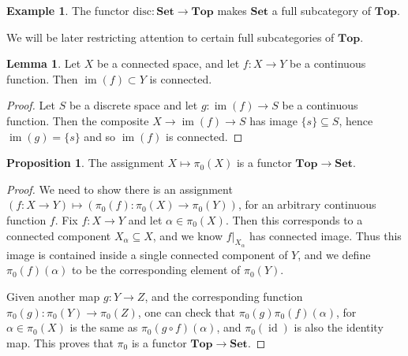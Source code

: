 \documentclass{tufte-handout}
\def\Set {\mathbf{Set}}
\def\Top {\mathbf{Top}}
\DeclareMathOperator{\id}{id}
\DeclareMathOperator{\im}{im}
\theoremstyle{definition}
\newtheorem{prop}{Proposition}
\newtheorem{lemma}{Lemma}
\newtheorem{example}{Example}
\begin{document}
\begin{example}
The functor 
$\mathrm{disc}\colon \Set \to \Top$ makes $\Set$ a full subcategory of $\Top$.
\end{example}

We will be later restricting attention to certain full subcategories of $\Top$.

\begin{lemma}\label{lemma:image_of_connected}
Let $X$ be a connected space, and let $f\colon X\to Y$ be a continuous function. 
Then $\im(f) \subset Y$ is connected.
\end{lemma}

\begin{proof}
Let $S$ be a discrete space and let $g\colon \im(f)\to S$ be a continuous function.
Then the composite $X\to \im(f) \to S$ has image $\{s\}\subseteq S$, hence $\im(g)=\{s\}$
and so $\im(f)$ is connected.
\end{proof}

\begin{prop}
The assignment $X\mapsto \pi_0(X)$ is a functor $\Top \to \Set$.
\end{prop}

\begin{proof}
We need to show there is an assignment 
$(f\colon X\to Y)\mapsto (\pi_0(f)\colon \pi_0(X) \to \pi_0(Y))$, 
for an arbitrary continuous function $f$. 
Fix $f\colon X\to Y$ and let $\alpha\in \pi_0(X)$. Then this corresponds to a connected
component $X_\alpha \subseteq X$, and we know $f\big|_{X_\alpha}$ has connected image.
Thus this image is contained inside a single connected component of $Y$, and we define
$\pi_0(f)(\alpha)$ to be the corresponding element of $\pi_0(Y)$.

Given another map $g\colon Y\to Z$, and the corresponding function 
$\pi_0(g)\colon \pi_0(Y)\to\pi_0(Z)$, one can check that $\pi_0(g)\pi_0(f)(\alpha)$, for 
$\alpha\in \pi_0(X)$ is the same as $\pi_0(g\circ f)(\alpha)$, and $\pi_0(\id)$ is also
the identity map. This proves that $\pi_0$ is a functor $\Top \to \Set$.
\end{proof}
\end{document}
